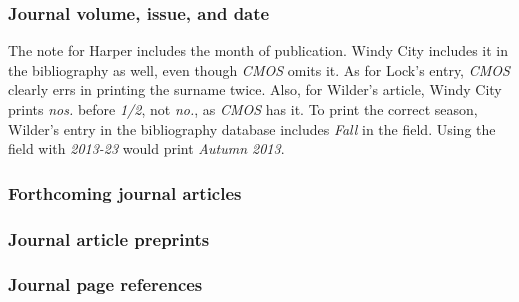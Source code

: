 \documentclass[11pt,letterpaper,oneside]{article}
\begin{document}
\setcounter{subsubsection}{170}
\subsubsection{Journal volume, issue, and date}
\label{14.171}

The note for Harper includes the month of publication. Windy City
includes it in the bibliography as well, even though \textit{CMOS}
omits it. As for Lock's entry, \textit{CMOS} clearly errs in printing
the surname twice. Also, for Wilder's article, Windy City prints
\textit{nos.} before \textit{1/2}, not \textit{no.}, as \textit{CMOS}
has it. To print the correct season, Wilder's entry in the
bibliography database includes \textit{Fall} in the 
field. Using the  field with \textit{2013-23} would
print \textit{Autumn 2013}.

\begin{citebib}
\item \cite[155]{lock2015}
\item \cite[651]{wesoky2015}
\item \cite[645]{harper2014}
\item \cite[60]{wilder2013}
\item \cite[52]{beattie1974}
\end{citebib}

\subsubsection{Forthcoming journal articles}
\label{14.172}

\begin{citebib}
\item \cite{authora}
\item \cite{jubb2015}
\end{citebib}

\subsubsection{Journal article preprints}
\label{14.173}

\begin{citebib}
\item \cite{huang2015}
\end{citebib}

\subsubsection{Journal page references}
\end{document}
